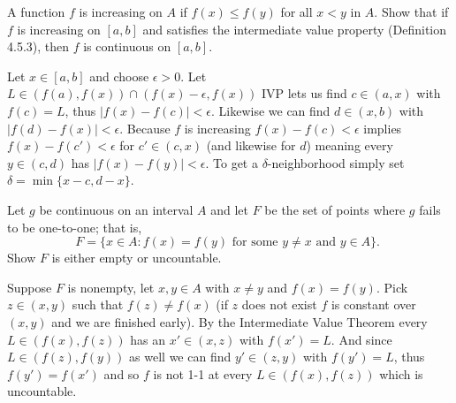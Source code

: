 \begin{exercise}
  A function $f$ is increasing on $A$ if $f(x) \leq f(y)$ for all $x<y$ in $A$. Show that if $f$ is increasing on $[a, b]$ and satisfies the intermediate value property (Definition 4.5.3), then $f$ is continuous on $[a, b]$.
\end{exercise}
\begin{solution}
  Let $x \in [a,b]$ and choose $\epsilon > 0$.
  Let $L \in (f(a), f(x)) \cap (f(x)-\epsilon, f(x))$ IVP lets us find $c \in (a, x)$ with $f(c)= L$, thus $|f(x) - f(c)| < \epsilon$.
  Likewise we can find $d \in (x,b)$ with $|f(d)-f(x)|<\epsilon$.
  Because $f$ is increasing $f(x)-f(c) < \epsilon$ implies $f(x)-f(c')<\epsilon$ for $c' \in (c, x)$ (and likewise for $d$) meaning every $y \in (c, d)$ has $|f(x)-f(y)|<\epsilon$. To get a $\delta$-neighborhood simply set $\delta = \min\{x-c, d-x\}$.
\end{solution}

\begin{exercise}
  Let $g$ be continuous on an interval $A$ and let $F$ be the set of points where $g$ fails to be one-to-one; that is,
  $$
  F=\{x \in A: f(x)=f(y) \text { for some } y \neq x \text { and } y \in A\} \text {. }
  $$
  Show $F$ is either empty or uncountable.
\end{exercise}
\begin{solution}
  Suppose $F$ is nonempty, let $x,y \in A$ with $x \ne y$ and $f(x) = f(y)$. Pick $z \in (x,y)$ such that $f(z) \ne f(x)$ (if $z$ does not exist $f$ is constant over $(x,y)$ and we are finished early). By the Intermediate Value Theorem every $L \in (f(x), f(z))$ has an $x' \in (x, z)$ with $f(x') = L$. And since $L \in (f(z), f(y))$ as well we can find $y' \in (z,y)$ with $f(y') = L$, thus $f(y') = f(x')$ and so $f$ is not 1-1 at every $L \in (f(x), f(z))$ which is uncountable.
\end{solution}


